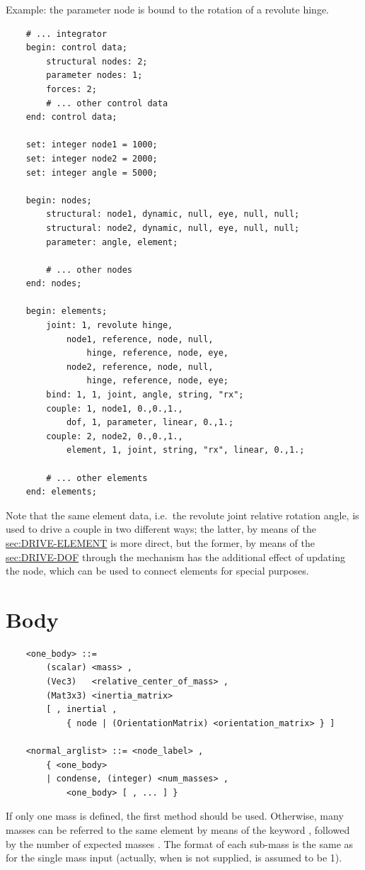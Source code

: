 Example: the parameter node  is bound to the rotation
of a revolute hinge.
\begin{verbatim}
    # ... integrator
    begin: control data;
        structural nodes: 2;
        parameter nodes: 1;
        forces: 2;
        # ... other control data
    end: control data;

    set: integer node1 = 1000;
    set: integer node2 = 2000;
    set: integer angle = 5000;

    begin: nodes;
        structural: node1, dynamic, null, eye, null, null;
        structural: node2, dynamic, null, eye, null, null;
        parameter: angle, element;

        # ... other nodes
    end: nodes;

    begin: elements;
        joint: 1, revolute hinge,
            node1, reference, node, null,
                hinge, reference, node, eye,
            node2, reference, node, null,
                hinge, reference, node, eye;
        bind: 1, 1, joint, angle, string, "rx";
        couple: 1, node1, 0.,0.,1.,
            dof, 1, parameter, linear, 0.,1.;
        couple: 2, node2, 0.,0.,1.,
            element, 1, joint, string, "rx", linear, 0.,1.;

        # ... other elements
    end: elements;
\end{verbatim}
Note that the same element data, i.e.\ the revolute joint 
relative rotation angle, is used to drive a couple in two different
ways; the latter, by means of the 
\hyperref{\kw{element} drive}{\kw{element} drive (see Section~}{)}{sec:DRIVE-ELEMENT}
is more direct, but the former, by means of the 
\hyperref{\kw{dof} drive}{\kw{dof} drive (see Section~}{)}{sec:DRIVE-DOF}
through the  mechanism has the additional effect of updating
the  node, which can be used to connect  elements 
for special purposes.



\section{Body}
\begin{verbatim}
    <one_body> ::=
        (scalar) <mass> , 
        (Vec3)   <relative_center_of_mass> ,
        (Mat3x3) <inertia_matrix>
        [ , inertial , 
            { node | (OrientationMatrix) <orientation_matrix> } ]

    <normal_arglist> ::= <node_label> ,
        { <one_body>
        | condense, (integer) <num_masses> ,
            <one_body> [ , ... ] }
\end{verbatim}
If only one mass is defined, the first method should be used. Otherwise,
many masses can be referred to the same element by means of the keyword
, followed by the number of expected masses .
The format of each sub-mass is the same as for the single mass input (actually, 
when  is not supplied,  is assumed to be 1).

